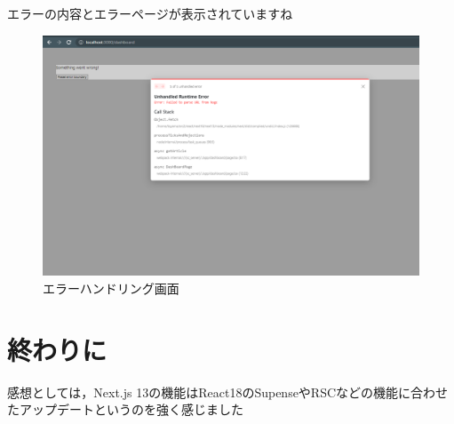 エラーの内容とエラーページが表示されていますね


\begin{figure}[H]
  \centering
  \includegraphics[width=12cm]{./image/03-Tech/chap4/08.png}
  \caption{エラーハンドリング画面}
\end{figure}



\section{終わりに}
感想としては，Next.js 13の機能はReact18のSupenseやRSCなどの機能に合わせたアップデートというのを強く感じました